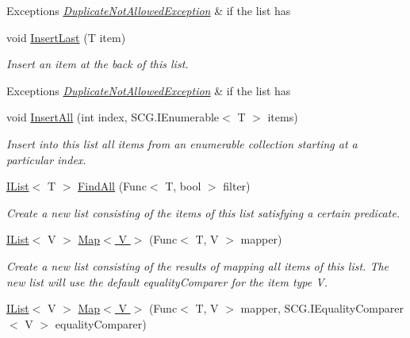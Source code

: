 \begin{DoxyCompactItemize}
\begin{DoxyCompactList}
\begin{DoxyExceptions}{Exceptions}
{\em \hyperlink{class_c5_1_1_duplicate_not_allowed_exception}{Duplicate\+Not\+Allowed\+Exception}} & if the list has \\
\hline
\end{DoxyExceptions}
\end{DoxyCompactList}\item 
void \hyperlink{interface_c5_1_1_i_list_adbb76aa84c81cf3d93130ed3d3abd967}{Insert\+Last} (T item)
\begin{DoxyCompactList}\small\item\em Insert an item at the back of this list. 
\begin{DoxyExceptions}{Exceptions}
{\em \hyperlink{class_c5_1_1_duplicate_not_allowed_exception}{Duplicate\+Not\+Allowed\+Exception}} & if the list has \\
\hline
\end{DoxyExceptions}
\end{DoxyCompactList}\item 
void \hyperlink{interface_c5_1_1_i_list_a551f34466ccd64b90929d8a92b984dc5}{Insert\+All} (int index, S\+C\+G.\+I\+Enumerable$<$ T $>$ items)
\begin{DoxyCompactList}\small\item\em Insert into this list all items from an enumerable collection starting at a particular index. \end{DoxyCompactList}\item 
\hyperlink{interface_c5_1_1_i_list}{I\+List}$<$ T $>$ \hyperlink{interface_c5_1_1_i_list_a8bd6c307e2b3e5cbd50e92dde854a1d0}{Find\+All} (Func$<$ T, bool $>$ filter)
\begin{DoxyCompactList}\small\item\em Create a new list consisting of the items of this list satisfying a certain predicate. \end{DoxyCompactList}\item 
\hyperlink{interface_c5_1_1_i_list}{I\+List}$<$ V $>$ \hyperlink{interface_c5_1_1_i_list_a8cf8a4682fe990ce32d7cf4a2bec84b6}{Map$<$ V $>$} (Func$<$ T, V $>$ mapper)
\begin{DoxyCompactList}\small\item\em Create a new list consisting of the results of mapping all items of this list. The new list will use the default equality\+Comparer for the item type V. \end{DoxyCompactList}\item 
\hyperlink{interface_c5_1_1_i_list}{I\+List}$<$ V $>$ \hyperlink{interface_c5_1_1_i_list_ad84aa90d1111a8cb7ea1226d8cfadab9}{Map$<$ V $>$} (Func$<$ T, V $>$ mapper, S\+C\+G.\+I\+Equality\+Comparer$<$ V $>$ equality\+Comparer)

\end{DoxyCompactItemize}
